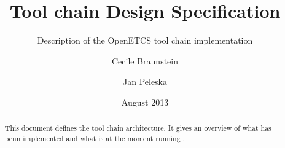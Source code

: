 \documentclass{template/openetcs_report}
\begin{document}
\frontmatter
{}




\title{Tool chain Design Specification}

\subtitle{Description of the OpenETCS tool chain implementation}

\date{August 2013}






\author{Cecile Braunstein \and Jan Peleska}







\begin{abstract}
This document defines the tool chain architecture. It gives an
overview of what has benn implemented and what is at the moment running .
\end{abstract}

\maketitle
\tableofcontents
\listoffiguresandtables

\newpage

\end{document}
